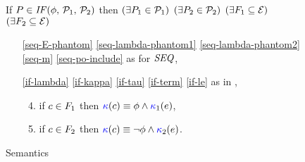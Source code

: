 \begin{figure}
\begin{multicols}{2}
  \end{multicols}
  \medskip

  \noindent
  If $\aPS \in \sIF{\aForm}\sTHEN\aPSS_1\sELSE\aPSS_2\sFI$ then
  $(\exists P_1\in\mathcal{P}_1)$ $(\exists P_2\in\mathcal{P}_2)$
  $(\exists F_1\subseteq\mathcal{E})$ $(\exists F_2\subseteq\mathcal{E})$
  \begin{multicols}{2}
    \begin{enumerate}[topsep=0pt,label=(\textsc{i}\arabic*),ref=\textsc{i}\arabic*]

    \item[\eqref{seq-E-phantom}]
      \eqref{seq-lambda-phantom1}\;
      \eqref{seq-lambda-phantom2}\;
      \eqref{seq-m}\;
      \eqref{seq-po-include}\;
      as for $\sSEMI{}{}$,

    \item[\eqref{if-lambda}]
      \eqref{if-kappa}\;
      \eqref{if-tau}\;
      \eqref{if-term}\; 
      \eqref{if-le}\;
      as in ,

      \columnbreak
      \setcounter{enumi}{\value{kappa}}
    \item[] 
      \begin{enumerate}[leftmargin=0pt]
        \setcounter{enumii}{3}
      \item \label{if-kappa-phantom1}
        if $c\in F_1$ then ${\color{blue}\kappa}(c) \mathrel{\equiv} \phi\land{\color{blue}\kappa}_1(e)$,
      \item \label{if-kappa-phantom2} 
        if $c\in F_2$ then ${\color{blue}\kappa}(c) \mathrel{\equiv} \lnot\phi\land{\color{blue}\kappa}_2(e)$.
      \end{enumerate}      

      
    \end{enumerate}
  \end{multicols}
  \medskip

  \caption{\PwTcTITLE{} Semantics}
  \label{fig:c11}
\end{figure}
